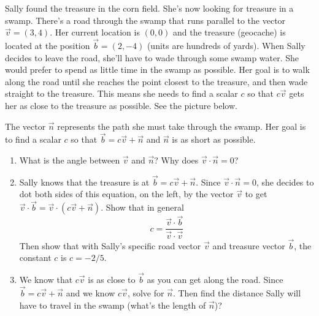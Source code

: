 \begin{problem}
 Sally found the treasure in the corn field.  She's now looking for treasure in a swamp. There's a road through the swamp that runs parallel to the vector $\vec v=(3,4)$. Her current location is $(0,0)$ and the treasure (geocache) is located at the position $\vec b=(2,-4)$ (units are hundreds of yards). When Sally decides to leave the road, she'll have to wade through some swamp water. She would prefer to spend as little time in the swamp as possible. Her goal is to walk along the road until she reaches the point closest to the treasure, and then wade straight to the treasure.  This means she needs to find a scalar $c$ so that $c\vec v$ gets her as close to the treasure as possible. See the picture below. 
\begin{center}	
\quad 
{}
\end{center}
The vector $\vec n$ represents the path she must take through the swamp. Her goal is to find a scalar $c$ so that $\vec b=c\vec v+\vec n$ and $\vec n$ is as short as possible. 
\begin{enumerate}
 \item What is the angle between $\vec v$ and $\vec n$? Why does $\vec v\cdot \vec n=0$?
 \item Sally knows that the treasure is at $\vec b = c\vec v+\vec n$.  Since $\vec v\cdot \vec n = 0$, she decides to dot both sides of this equation, on the left, by the vector $\vec v$ to get $\vec v\cdot \vec b = \vec v\cdot (c\vec v+\vec n)$. Show that in general $$c = \dfrac{\vec v\cdot \vec b}{\vec v\cdot \vec v} 
$$ Then show that with Sally's specific road vector $\vec v$ and treasure vector $\vec b$, the constant $c$ is $c=-2/5$. 
 \item We know that $c\vec v$ is as close to $\vec b$ as you can get along the road. Since $\vec b = c\vec v+\vec n$ and we know $c\vec v$, solve for $\vec n$. Then find the distance Sally will have to travel in the swamp (what's the length of $\vec n$)? 
\end{enumerate}
 \end{problem}
 

